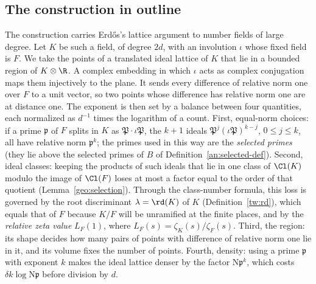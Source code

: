 \subsection{The construction in outline}\label{intro:outline}
The construction carries Erd\H{o}s's lattice argument to number fields
of large degree. Let $K$ be such a field, of degree $2d$, with an
involution $\iota$ whose fixed field is $F$. We take the points of a
translated ideal lattice of $K$ that lie in a bounded region of
$K\otimes\R$. A complex embedding in which $\iota$ acts as complex
conjugation maps them injectively to the plane. It sends every
difference of relative norm one over $F$ to a unit vector, so two points
whose difference has relative norm one are at distance one. The
exponent is then set by a balance between four quantities, each
normalized as $d^{-1}$ times the logarithm of a count. First,
equal-norm choices: if a prime $\mathfrak p$ of $F$ splits in $K$ as
$\mathfrak P\cdot\iota\mathfrak P$, the $k+1$ ideals
$\mathfrak P^j(\iota\mathfrak P)^{k-j}$, $0\le j\le k$, all have
relative norm $\mathfrak p^k$; the primes used in this way are the
\emph{selected primes} (they lie above the selected primes of $B$ of
Definition~\ref{an:selected-def}). Second, ideal classes: keeping the products of
such ideals that lie in one class of $\Cl(K)$ modulo the image of
$\Cl(F)$ loses at most a factor equal to the order of that quotient
(Lemma~\ref{geo:selection}). Through the class-number formula, this loss
is governed by the root discriminant $\lambda=\rd(K)$ of $K$
(Definition~\ref{tw:rd}), which equals that of $F$ because $K/F$ will be
unramified at the finite places, and by the
\emph{relative zeta value} $L_F(1)$, where $L_F(s)=\zeta_K(s)/\zeta_F(s)$.
Third, the region: its shape decides how many pairs of points with
difference of relative norm one lie in it, and its volume fixes the
number of points. Fourth, density: using a prime $\mathfrak p$ with
exponent $k$ makes the ideal lattice denser by the factor
$\mathrm N\mathfrak p^k$, which costs $\delta k\log\mathrm N\mathfrak p$ before
division by $d$.

